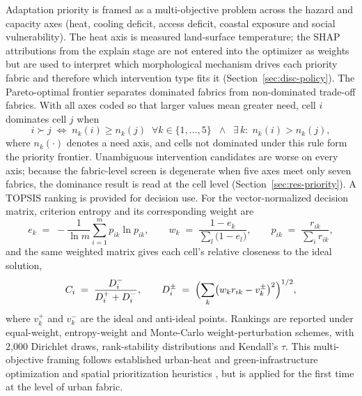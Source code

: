 \label{sec:methods-optimize}
Adaptation priority is framed as a multi-objective problem across the hazard and
capacity axes (heat, cooling deficit, access deficit, coastal exposure and social
vulnerability). The
heat axis is measured land-surface temperature; the SHAP attributions from
the explain stage are not entered into the optimizer as weights but are used to
interpret which morphological mechanism drives each priority fabric and
therefore which intervention type fits it (Section~\ref{sec:disc-policy}). The
Pareto-optimal frontier separates dominated fabrics from non-dominated trade-off
fabrics. With all axes coded so that larger values mean greater need, cell $i$
dominates cell $j$ when
\begin{equation}\label{eq:pareto}
i \succ j \;\iff\; n_{k}(i) \ge n_{k}(j)\;\; \forall k \in \{1,\dots,5\}
\;\;\wedge\;\; \exists\, k :\; n_{k}(i) > n_{k}(j),
\end{equation}
where $n_k(\cdot)$ denotes a need axis, and cells not dominated under this rule form
the priority frontier. Unambiguous intervention candidates are worse on every
axis;
because the fabric-level screen is degenerate when five axes meet only seven
fabrics, the dominance result is read at the cell level
(Section~\ref{sec:res-priority}). A
TOPSIS ranking \citep{hwang1981MultipleAttribute} is provided for decision use.
For the vector-normalized decision matrix, criterion entropy and its corresponding
weight are
\begin{equation}\label{eq:entropy}
e_{k} \;=\; -\frac{1}{\ln m} \sum_{i=1}^{m} p_{ik} \ln p_{ik},
\qquad
w_{k} \;=\; \frac{1 - e_{k}}{\sum_{l} \bigl(1 - e_{l}\bigr)},
\qquad
p_{ik} \;=\; \frac{r_{ik}}{\sum_{i} r_{ik}},
\end{equation}
and the same weighted matrix gives each cell's relative closeness to the ideal
solution,
\begin{equation}\label{eq:topsis}
C_{i} \;=\; \frac{D_{i}^{-}}{D_{i}^{+} + D_{i}^{-}},
\qquad
D_{i}^{\pm} \;=\; \Bigl( \sum_{k} \bigl( w_{k} r_{ik} - v_{k}^{\pm} \bigr)^{2} \Bigr)^{1/2},
\end{equation}
where $v_k^{+}$ and $v_k^{-}$ are the ideal and anti-ideal points. Rankings are
reported under equal-weight, entropy-weight and Monte-Carlo weight-perturbation
schemes, with 2{,}000 Dirichlet draws, rank-stability distributions and Kendall's
$\tau$. This multi-objective
framing follows established urban-heat and green-infrastructure optimization
\citep{zhang2024MultiObjective, zhu2025SpongeCities} and spatial prioritization
heuristics \citep{schroter2016SpatialPrioriti}, but is applied for the first time
at the level of urban fabric.

